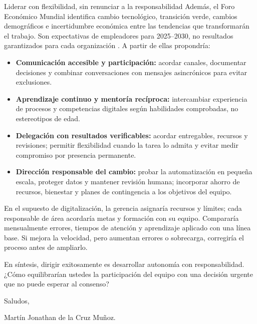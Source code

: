 \documentclass[11pt,letterpaper,oneside]{article}
\begin{document}
\begin{forobox}{Liderar con flexibilidad, sin renunciar a la responsabilidad}
Además, el Foro Económico Mundial identifica cambio tecnológico, transición verde, cambios demográficos e incertidumbre económica entre las tendencias que transformarán el trabajo. Son expectativas de empleadores para 2025--2030, no resultados garantizados para cada organización \citep{wefFutureJobs2025}. A partir de ellas propondría:
\begin{itemize}
  \item \textbf{Comunicación accesible y participación:} acordar canales, documentar decisiones y combinar conversaciones con mensajes asincrónicos para evitar exclusiones.
  \item \textbf{Aprendizaje continuo y mentoría recíproca:} intercambiar experiencia de procesos y competencias digitales según habilidades comprobadas, no estereotipos de edad.
  \item \textbf{Delegación con resultados verificables:} acordar entregables, recursos y revisiones; permitir flexibilidad cuando la tarea lo admita y evitar medir compromiso por presencia permanente.
  \item \textbf{Dirección responsable del cambio:} probar la automatización en pequeña escala, proteger datos y mantener revisión humana; incorporar ahorro de recursos, bienestar y planes de contingencia a los objetivos del equipo.
\end{itemize}
En el supuesto de digitalización, la gerencia asignaría recursos y límites; cada responsable de área acordaría metas y formación con su equipo. Compararía mensualmente errores, tiempos de atención y aprendizaje aplicado con una línea base. Si mejora la velocidad, pero aumentan errores o sobrecarga, corregiría el proceso antes de ampliarlo.

En síntesis, dirigir exitosamente es desarrollar autonomía con responsabilidad. ¿Cómo equilibrarían ustedes la participación del equipo con una decisión urgente que no puede esperar al consenso?

Saludos,\par
Martín Jonathan de la Cruz Muñoz.


\end{forobox}
\end{document}
